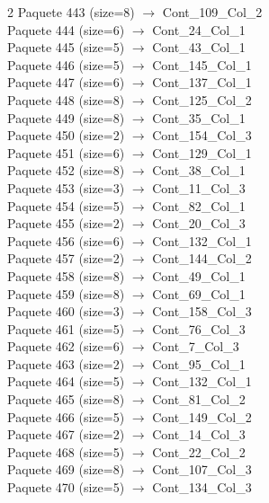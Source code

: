 \begin{multicols}{2}
Paquete 443 (size=8) $\rightarrow$ Cont\_109\_Col\_2\\
Paquete 444 (size=6) $\rightarrow$ Cont\_24\_Col\_1\\
Paquete 445 (size=5) $\rightarrow$ Cont\_43\_Col\_1\\
Paquete 446 (size=5) $\rightarrow$ Cont\_145\_Col\_1\\
Paquete 447 (size=6) $\rightarrow$ Cont\_137\_Col\_1\\
Paquete 448 (size=8) $\rightarrow$ Cont\_125\_Col\_2\\
Paquete 449 (size=8) $\rightarrow$ Cont\_35\_Col\_1\\
Paquete 450 (size=2) $\rightarrow$ Cont\_154\_Col\_3\\
Paquete 451 (size=6) $\rightarrow$ Cont\_129\_Col\_1\\
Paquete 452 (size=8) $\rightarrow$ Cont\_38\_Col\_1\\
Paquete 453 (size=3) $\rightarrow$ Cont\_11\_Col\_3\\
Paquete 454 (size=5) $\rightarrow$ Cont\_82\_Col\_1\\
Paquete 455 (size=2) $\rightarrow$ Cont\_20\_Col\_3\\
Paquete 456 (size=6) $\rightarrow$ Cont\_132\_Col\_1\\
Paquete 457 (size=2) $\rightarrow$ Cont\_144\_Col\_2\\
Paquete 458 (size=8) $\rightarrow$ Cont\_49\_Col\_1\\
Paquete 459 (size=8) $\rightarrow$ Cont\_69\_Col\_1\\
Paquete 460 (size=3) $\rightarrow$ Cont\_158\_Col\_3\\
Paquete 461 (size=5) $\rightarrow$ Cont\_76\_Col\_3\\
Paquete 462 (size=6) $\rightarrow$ Cont\_7\_Col\_3\\
Paquete 463 (size=2) $\rightarrow$ Cont\_95\_Col\_1\\
Paquete 464 (size=5) $\rightarrow$ Cont\_132\_Col\_1\\
Paquete 465 (size=8) $\rightarrow$ Cont\_81\_Col\_2\\
Paquete 466 (size=5) $\rightarrow$ Cont\_149\_Col\_2\\
Paquete 467 (size=2) $\rightarrow$ Cont\_14\_Col\_3\\
Paquete 468 (size=5) $\rightarrow$ Cont\_22\_Col\_2\\
Paquete 469 (size=8) $\rightarrow$ Cont\_107\_Col\_3\\
Paquete 470 (size=5) $\rightarrow$ Cont\_134\_Col\_3\\

\end{multicols}
